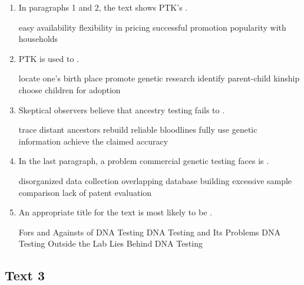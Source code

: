 \begin{enumerate}[resume]
	\item
 In paragraphs 1 and 2, the text shows PTK's \lineread.


\fourchoices
{easy availability}
{flexibility in pricing}
{successful promotion}
{popularity with households}



\item
 PTK is used to \lineread.


\fourchoices
{locate one's birth place}
{promote genetic research}
{identify parent-child kinship}
{choose children for adoption}



\item
Skeptical observers believe that ancestry testing fails
to \lineread.


\fourchoices
{trace distant ancestors}
{rebuild reliable bloodlines}
{fully use genetic information}
{achieve the claimed accuracy}


\item
 In the last paragraph, a problem commercial genetic testing
faces is \lineread.


\fourchoices
{disorganized data collection}
{overlapping database building}
{excessive sample comparison}
{lack of patent evaluation}



\item
An appropriate title for the text is most likely to
be \lineread.


\fourchoices
{Fors and Againsts of DNA Testing}
{DNA Testing and Its Problems}
{DNA Testing Outside the Lab}
{Lies Behind DNA Testing}


\end{enumerate}


\newpage
\subsection{Text 3}

